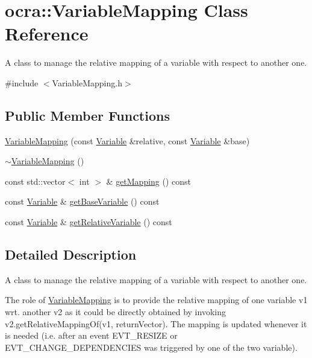\hypertarget{classocra_1_1VariableMapping}{}\section{ocra\+:\+:Variable\+Mapping Class Reference}
\label{classocra_1_1VariableMapping}


A class to manage the relative mapping of a variable with respect to another one.  




{\ttfamily \#include $<$Variable\+Mapping.\+h$>$}

\subsection*{Public Member Functions}
\begin{DoxyCompactItemize}
\item 
\hyperlink{classocra_1_1VariableMapping_a05d5789ef9b868666a9e1eaf1294369c}{Variable\+Mapping} (const \hyperlink{classocra_1_1Variable}{Variable} \&relative, const \hyperlink{classocra_1_1Variable}{Variable} \&base)
\item 
\hyperlink{classocra_1_1VariableMapping_ad27dd236ac480197c10f8bb9ab15b6bd}{$\sim$\+Variable\+Mapping} ()
\item 
const std\+::vector$<$ int $>$ \& \hyperlink{classocra_1_1VariableMapping_a79fc93dd267e09cb4cb07a2a34e4a4fa}{get\+Mapping} () const
\item 
const \hyperlink{classocra_1_1Variable}{Variable} \& \hyperlink{classocra_1_1VariableMapping_ae4ab5717c945cb67425b542807d454ed}{get\+Base\+Variable} () const
\item 
const \hyperlink{classocra_1_1Variable}{Variable} \& \hyperlink{classocra_1_1VariableMapping_ab62611a9b9528ae74f9f259238f7a440}{get\+Relative\+Variable} () const
\end{DoxyCompactItemize}


\subsection{Detailed Description}
A class to manage the relative mapping of a variable with respect to another one. 

The role of \hyperlink{classocra_1_1VariableMapping}{Variable\+Mapping} is to provide the relative mapping of one variable v1 wrt. another v2 as it could be directly obtained by invoking v2.\+get\+Relative\+Mapping\+Of(v1, return\+Vector). The mapping is updated whenever it is needed (i.\+e. after an event E\+V\+T\+\_\+\+R\+E\+S\+I\+ZE or E\+V\+T\+\_\+\+C\+H\+A\+N\+G\+E\+\_\+\+D\+E\+P\+E\+N\+D\+E\+N\+C\+I\+ES was triggered by one of the two variable). 

